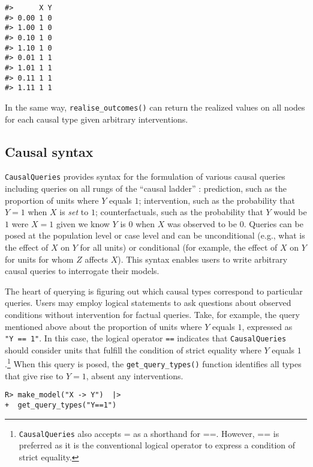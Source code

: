 \documentclass[
  11pt,
  article]{jss}
\begin{document}
\begin{verbatim}
#>      X Y
#> 0.00 1 0
#> 1.00 1 0
#> 0.10 1 0
#> 1.10 1 0
#> 0.01 1 1
#> 1.01 1 1
#> 0.11 1 1
#> 1.11 1 1
\end{verbatim}

In the same way, \texttt{realise\_outcomes()} can return the realized
values on all nodes for each causal type given arbitrary interventions.

\hypertarget{sec-syntax}{%
\subsection{Causal syntax}\label{sec-syntax}}

\texttt{CausalQueries} provides syntax for the formulation of various
causal queries including queries on all rungs of the ``causal ladder''
\citep{pearl_causality_2009}: prediction, such as the proportion of
units where \(Y\) equals \(1\); intervention, such as the probability
that \(Y = 1\) when \(X\) is \emph{set} to \(1\); counterfactuals, such
as the probability that \(Y\) would be \(1\) were \(X = 1\) given we
know \(Y\) is \(0\) when \(X\) was observed to be \(0\). Queries can be
posed at the population level or case level and can be unconditional
(e.g., what is the effect of \(X\) on \(Y\) for all units) or
conditional (for example, the effect of \(X\) on \(Y\) for units for
whom \(Z\) affects \(X\)). This syntax enables users to write arbitrary
causal queries to interrogate their models.

The heart of querying is figuring out which causal types correspond to
particular queries. Users may employ logical statements to ask questions
about observed conditions without intervention for factual queries.
Take, for example, the query mentioned above about the proportion of
units where \(Y\) equals \(1\), expressed as \texttt{"Y\ ==\ 1"}. In
this case, the logical operator \texttt{==} indicates that
\texttt{CausalQueries} should consider units that fulfill the condition
of strict equality where \(Y\) equals \(1\).\footnote{\texttt{CausalQueries}
  also accepts = as a shorthand for ==. However, == is preferred as it
  is the conventional logical operator to express a condition of strict
  equality.} When this query is posed, the \texttt{get\_query\_types()}
function identifies all types that give rise to \(Y=1\), absent any
interventions.

\begin{verbatim}
R> make_model("X -> Y")  |> 
+  get_query_types("Y==1")
\end{verbatim}
\end{document}
